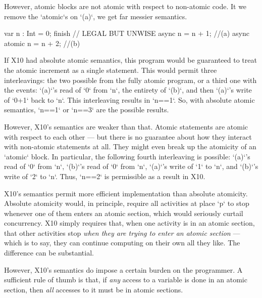 However, atomic blocks are not atomic with respect to non-atomic code.  It we
remove the  \xcd`atomic`s on \xcd`(a)`, we get far messier semantics.
\begin{xten}
var n : Int = 0;
finish {
  // LEGAL BUT UNWISE 
  async n = n + 1;          //(a)
  async atomic n = n + 2;   //(b)
}
\end{xten}

If X10 had absolute atomic semantics, this program would be guaranteed to
treat the atomic increment as a single statement.  This would permit three
interleavings: the two possible from the fully atomic program, or a third one
with the events:  \xcd`(a)`'s read of \xcd`0` from \xcd`n`, the entirety of
\xcd`(b)`, and then \xcd`(a)`'s write of \xcd`0+1` back to \xcd`n`.  This
interleaving results in \xcd`n==1`. So, with absolute atomic semantics,
\xcd`n==1` or \xcd`n==3` are the possible results.

However, X10's semantics are weaker than that.  Atomic statements are atomic
with respect to each other --- but there is no guarantee about how they
interact with non-atomic statements at all.  They might even break up the
atomicity of an \xcd`atomic` block.
In particular, the following
fourth interleaving is possible: \xcd`(a)`'s read of \xcd`0` from \xcd`n`, 
\xcd`(b)`'s read of \xcd`0` from \xcd`n`, \xcd`(a)`'s write of \xcd`1` to
\xcd`n`, and \xcd`(b)`'s write of \xcd`2` to \xcd`n`.   Thus, \xcd`n==2` is
permissible as a result in X10.

X10's semantics permit more efficient implementation than absolute atomicity.
Absolute atomicity would, in principle, require all activities at place
\xcd`p` to stop whenever one of them enters an atomic section, which would
seriously curtail concurrency.  X10 simply requires that, when one activity is
in an atomic section, that other activities stop {\em when they are trying to
enter an atomic section} --- which is to say, they can continue computing on
their own all they like.  The difference can be substantial.

However, X10's semantics do impose a certain burden on the programmer.  A
sufficient rule of thumb is that, if {\em any} access to a
variable is done in an atomic section, then {\em all} accesses to it must be
in atomic sections.  
